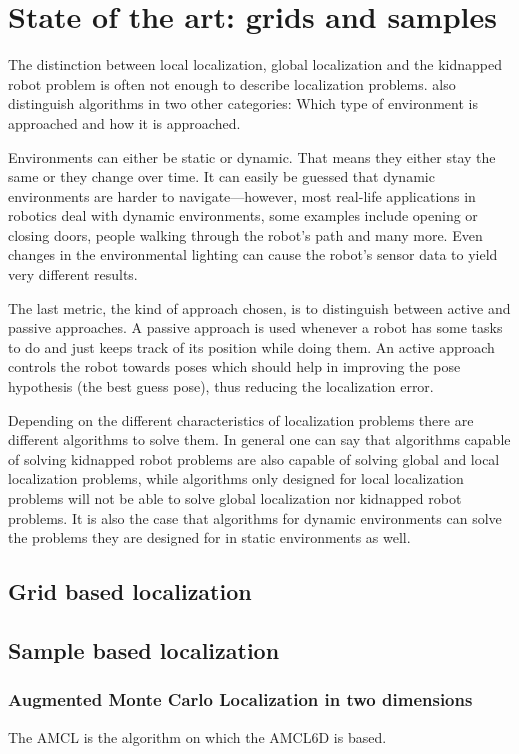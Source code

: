 \documentclass[Thesis.tex]{subfiles}
\begin{document}
\chapter{State of the art: grids and samples}
The distinction between local localization, global localization and the kidnapped robot problem is often not enough to describe localization problems. \citet{ThrunBurgardFox:2005} also distinguish algorithms in two other categories: Which type of environment is approached and how it is approached.

Environments can either be static or dynamic. That means they either stay the same or they change over time. It can easily be guessed that dynamic environments are harder to navigate---however, most real-life applications in robotics deal with dynamic environments, some examples include opening or closing doors, people walking through the robot's path and many more. Even changes in the environmental lighting can cause the robot's sensor data to yield very different results. 

The last metric, the kind of approach chosen, is to distinguish between active and passive approaches. A passive approach is used whenever a robot has some tasks to do and just keeps track of its position while doing them. An active approach controls the robot towards poses which should help in improving the pose hypothesis (the best guess pose), thus reducing the localization error.

Depending on the different characteristics of localization problems there are different algorithms to solve them. In general one can say that algorithms capable of solving kidnapped robot problems are also capable of solving global and local localization problems, while algorithms only designed for local localization problems will not be able to solve global localization nor kidnapped robot problems. It is also the case that algorithms for dynamic environments can solve the problems they are designed for in static environments as well. 

\section{Grid based localization}



\section{Sample based localization}


\subsection{Augmented Monte Carlo Localization in two dimensions}
The \gls{AMCL} is the algorithm on which the \gls{AMCL6D} is based. 
\end{document}
